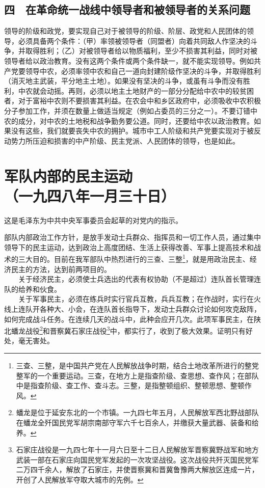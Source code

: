 \documentclass[cn,11pt,chinese]{elegantbook}
\def\myformat#1{\hfil\hfil #1}
\begin{document}
\subsection*{\myformat{四　在革命统一战线中领导者和被领导者的关系问题}}
领导的阶级和政党，要实现自己对于被领导的阶级、阶层、政党和人民团体的领导，必须具备两个条件：（甲）率领被领导者（同盟者）向着共同敌人作坚决的斗争，并取得胜利；（乙）对被领导者给以物质福利，至少不损害其利益，同时对被领导者给以政治教育。没有这两个条件或两个条件缺一，就不能实现领导。例如共产党要领导中农，必须率领中农和自己一道向封建阶级作坚决的斗争，并取得胜利（消灭地主武装，平分地主土地）。如果没有坚决的斗争，或虽有斗争而没有胜利，中农就会动摇。再则，必须以地主土地财产的一部分分配给中农中的较贫困者，对于富裕中农则不要损害其利益。在农会中和乡区政府中，必须吸收中农积极分子参加工作，并须在数量上做适当规定（例如占委员的三分之一）。不要订错中农的成分，对中农的土地税和战争勤务要公道。同时，还要给中农以政治教育。如果没有这些，我们就要丧失中农的拥护。城市中工人阶级和共产党要实现对于被反动势力所压迫和损害的中产阶级、民主党派、人民团体的领导，也是如此。\\
\newpage\section*{\myformat{军队内部的民主运动}\\\myformat{（一九四八年一月三十日）}}
\begin{introduction}\item
这是毛泽东为中共中央军事委员会起草的对党内的指示。
\end{introduction}
部队内部政治工作方针，是放手发动士兵群众、指挥员和一切工作人员，通过集中领导下的民主运动，达到政治上高度团结、生活上获得改善、军事上提高技术和战术的三大目的。目前在我军部队中热烈进行的三查、三整\footnote[1]{ 三查、三整，是中国共产党在人民解放战争时期，结合土地改革所进行的整党整军的一个重要运动。三查，在地方上是指查阶级、查思想、查作风；在部队中是指查阶级、查工作、查斗志。三整，是指整顿组织、整顿思想、整顿作风。}，就是用政治民主、经济民主的方法，达到前两项目的。\\
　　关于经济民主，必须使士兵选出的代表有权协助（不是超过）连队首长管理连队的给养和伙食。\\
　　关于军事民主，必须在练兵时实行官兵互教，兵兵互教；在作战时，实行在火线上连队开各种大、小会，在连队首长指导下，发动士兵群众讨论如何攻克敌阵，如何完成战斗任务。在连续几天的战斗中，此种会应开几次。此项军事民主，在陕北蟠龙战役\footnote[2]{ 蟠龙是位于延安东北的一个市镇。一九四七年五月，人民解放军西北野战部队在蟠龙全歼国民党军胡宗南部守军六千七百余人，并缴获大量武器、装备和给养。}和晋察冀石家庄战役\footnote[3]{ 石家庄战役是一九四七年十一月六日至十二日人民解放军晋察冀野战军和地方武装一部在石家庄向国民党军发起的一次攻坚战役。这次战役共歼灭国民党军二万四千余人，解放了石家庄，并使晋察冀和晋冀鲁豫两大解放区连成一片，开创了人民解放军夺取大城市的先例。}中，都实行了，收到了极大效果。证明只有好处，毫无害处。\\
\end{document}
